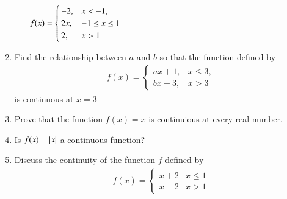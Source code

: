 \begin{enumerate}[label=\arabic*.,ref=\thesubsection.\theenumi]
\begin{enumerate}
$
\begin{alignedat}[t]{2}
f(x)=
\begin{cases}
-2, & x < -1,
\\
2x, & -1 \le x \le  1
\\
2, & x >  1
\end{cases}
\end{alignedat}
$
\end{enumerate}
%
\item Find the relationship between $a$ and $b$ so that the function defined by 	
%
\begin{align}
f(x)=
\begin{cases}
ax+1, & x \le 3,
\\
bx+3, & x > 3
\end{cases}
\end{align}
%
is continuous at $x = 3$
%
\item Prove that the function $f(x) = x$ is continuious at every real number.
\item Is $f(x) = \left\vert x\right\vert$ a continuous function?
\item Discuss the continuity of the function $f$ defined by 
%
\begin{align}
f(x)  = 
\begin{cases}
x+2 & x \le 1
\\
x-2 & x > 1
\end{cases}
\end{align}


\end{enumerate}
